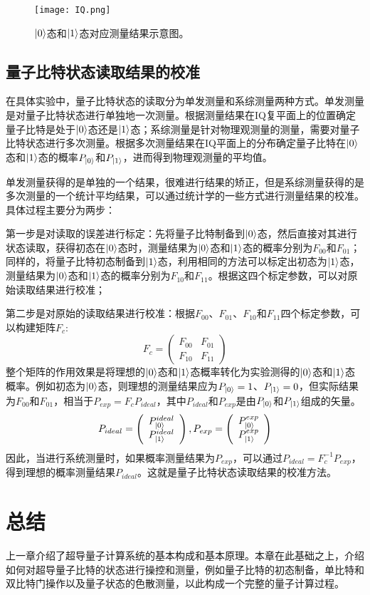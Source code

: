 \begin{figure}[h]
	\centering
	\texttt{[image: IQ.png]}
	\caption{$\left|0\right>$态和$\left|1\right>$态对应测量结果示意图。}
	\label{fig:IQ}
\end{figure}

\subsection{量子比特状态读取结果的校准}
在具体实验中，量子比特状态的读取分为单发测量和系综测量两种方式。单发测量是对量子比特状态进行单独地一次测量。根据测量结果在IQ复平面上的位置确定量子比特是处于$\left|0\right>$态还是$\left|1\right>$态；系综测量是针对物理观测量的测量，需要对量子比特状态进行多次测量。根据多次测量结果在IQ平面上的分布确定量子比特在$\left|0\right>$态和$\left|1\right>$态的概率$ P_{\left|0\right>}$和$ P_{\left|1\right>}$，进而得到物理观测量的平均值。

单发测量获得的是单独的一个结果，很难进行结果的矫正，但是系综测量获得的是多次测量的一个统计平均结果，可以通过统计学的一些方式进行测量结果的校准。具体过程主要分为两步：

第一步是对读取的误差进行标定：先将量子比特制备到$\left|0\right>$态，然后直接对其进行状态读取，获得初态在$\left|0\right>$态时，测量结果为$\left|0\right>$态和$\left|1\right>$态的概率分别为$ F_{00}$和$ F_{01}$；同样的，将量子比特初态制备到$\left|1\right>$态，利用相同的方法可以标定出初态为$\left|1\right>$态，测量结果为$\left|0\right>$态和$\left|1\right>$态的概率分别为$F_{10}$和$ F_{11}$。根据这四个标定参数，可以对原始读取结果进行校准；

第二步是对原始的读取结果进行校准：根据$F_{00}$、$F_{01}$、$F_{10}$和$F_{11}$四个标定参数，可以构建矩阵${F_{c}}$:
\begin{equation}
	{F_{c}} = \left(\begin{array}{cc}
		F_{00}&F_{01}\\
		F_{10}&F_{11}
	\end{array}\right)
\end{equation}
整个矩阵的作用效果是将理想的$\left|0\right>$态和$\left|1\right>$态概率转化为实验测得的$\left|0\right>$态和$\left|1\right>$态概率。例如初态为$\left|0\right>$态，则理想的测量结果应为$ P_{\left|0\right>}=1$、$ P_{\left|1\right>}=0$，但实际结果为$F_{00}$和$F_{01}$，相当于${P_{exp}}={F_{c}}{P_{ideal}}$，其中${P_{ideal}}$和${P_{exp}}$是由$ P_{\left|0\right>}$和$P_{\left|1\right>}$组成的矢量。
\begin{equation}
	{P_{ideal}} = \left(\begin{array}{c}
		P_{\left|0\right>}^{ideal}\\
		P_{\left|1\right>}^{ideal}
	\end{array}\right),
	{P_{exp}} = \left(\begin{array}{c}
		P_{\left|0\right>}^{exp}\\
		P_{\left|1\right>}^{exp}
	\end{array}\right)
\end{equation}
因此，当进行系统测量时，如果概率测量结果为${P_{exp}}$，可以通过${P_{ideal}}={F_{c}^{-1}}{P_{exp}}$，得到理想的概率测量结果${P_{ideal}}$。这就是量子比特状态读取结果的校准方法。

\section{总结}
上一章介绍了超导量子计算系统的基本构成和基本原理。本章在此基础之上，介绍如何对超导量子比特的状态进行操控和测量，例如量子比特的初态制备，单比特和双比特门操作以及量子状态的色散测量，以此构成一个完整的量子计算过程。